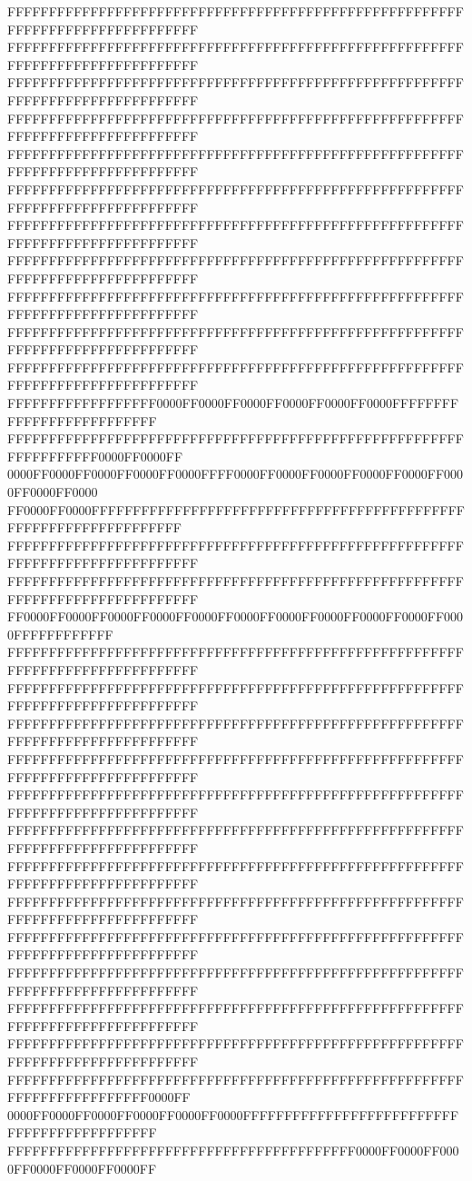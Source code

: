 FFFFFFFFFFFFFFFFFFFFFFFFFFFFFFFFFFFFFFFFFFFFFFFFFFFFFFFFFFFFFFFFFFFFFFFFFFFFFF
FFFFFFFFFFFFFFFFFFFFFFFFFFFFFFFFFFFFFFFFFFFFFFFFFFFFFFFFFFFFFFFFFFFFFFFFFFFFFF
FFFFFFFFFFFFFFFFFFFFFFFFFFFFFFFFFFFFFFFFFFFFFFFFFFFFFFFFFFFFFFFFFFFFFFFFFFFFFF
FFFFFFFFFFFFFFFFFFFFFFFFFFFFFFFFFFFFFFFFFFFFFFFFFFFFFFFFFFFFFFFFFFFFFFFFFFFFFF
FFFFFFFFFFFFFFFFFFFFFFFFFFFFFFFFFFFFFFFFFFFFFFFFFFFFFFFFFFFFFFFFFFFFFFFFFFFFFF
FFFFFFFFFFFFFFFFFFFFFFFFFFFFFFFFFFFFFFFFFFFFFFFFFFFFFFFFFFFFFFFFFFFFFFFFFFFFFF
FFFFFFFFFFFFFFFFFFFFFFFFFFFFFFFFFFFFFFFFFFFFFFFFFFFFFFFFFFFFFFFFFFFFFFFFFFFFFF
FFFFFFFFFFFFFFFFFFFFFFFFFFFFFFFFFFFFFFFFFFFFFFFFFFFFFFFFFFFFFFFFFFFFFFFFFFFFFF
FFFFFFFFFFFFFFFFFFFFFFFFFFFFFFFFFFFFFFFFFFFFFFFFFFFFFFFFFFFFFFFFFFFFFFFFFFFFFF
FFFFFFFFFFFFFFFFFFFFFFFFFFFFFFFFFFFFFFFFFFFFFFFFFFFFFFFFFFFFFFFFFFFFFFFFFFFFFF
FFFFFFFFFFFFFFFFFFFFFFFFFFFFFFFFFFFFFFFFFFFFFFFFFFFFFFFFFFFFFFFFFFFFFFFFFFFFFF
FFFFFFFFFFFFFFFFFF0000FF0000FF0000FF0000FF0000FF0000FFFFFFFFFFFFFFFFFFFFFFFFFF
FFFFFFFFFFFFFFFFFFFFFFFFFFFFFFFFFFFFFFFFFFFFFFFFFFFFFFFFFFFFFFFFFF0000FF0000FF
0000FF0000FF0000FF0000FF0000FFFF0000FF0000FF0000FF0000FF0000FF0000FF0000FF0000
FF0000FF0000FFFFFFFFFFFFFFFFFFFFFFFFFFFFFFFFFFFFFFFFFFFFFFFFFFFFFFFFFFFFFFFFFF
FFFFFFFFFFFFFFFFFFFFFFFFFFFFFFFFFFFFFFFFFFFFFFFFFFFFFFFFFFFFFFFFFFFFFFFFFFFFFF
FFFFFFFFFFFFFFFFFFFFFFFFFFFFFFFFFFFFFFFFFFFFFFFFFFFFFFFFFFFFFFFFFFFFFFFFFFFFFF
FF0000FF0000FF0000FF0000FF0000FF0000FF0000FF0000FF0000FF0000FF0000FFFFFFFFFFFF
FFFFFFFFFFFFFFFFFFFFFFFFFFFFFFFFFFFFFFFFFFFFFFFFFFFFFFFFFFFFFFFFFFFFFFFFFFFFFF
FFFFFFFFFFFFFFFFFFFFFFFFFFFFFFFFFFFFFFFFFFFFFFFFFFFFFFFFFFFFFFFFFFFFFFFFFFFFFF
FFFFFFFFFFFFFFFFFFFFFFFFFFFFFFFFFFFFFFFFFFFFFFFFFFFFFFFFFFFFFFFFFFFFFFFFFFFFFF
FFFFFFFFFFFFFFFFFFFFFFFFFFFFFFFFFFFFFFFFFFFFFFFFFFFFFFFFFFFFFFFFFFFFFFFFFFFFFF
FFFFFFFFFFFFFFFFFFFFFFFFFFFFFFFFFFFFFFFFFFFFFFFFFFFFFFFFFFFFFFFFFFFFFFFFFFFFFF
FFFFFFFFFFFFFFFFFFFFFFFFFFFFFFFFFFFFFFFFFFFFFFFFFFFFFFFFFFFFFFFFFFFFFFFFFFFFFF
FFFFFFFFFFFFFFFFFFFFFFFFFFFFFFFFFFFFFFFFFFFFFFFFFFFFFFFFFFFFFFFFFFFFFFFFFFFFFF
FFFFFFFFFFFFFFFFFFFFFFFFFFFFFFFFFFFFFFFFFFFFFFFFFFFFFFFFFFFFFFFFFFFFFFFFFFFFFF
FFFFFFFFFFFFFFFFFFFFFFFFFFFFFFFFFFFFFFFFFFFFFFFFFFFFFFFFFFFFFFFFFFFFFFFFFFFFFF
FFFFFFFFFFFFFFFFFFFFFFFFFFFFFFFFFFFFFFFFFFFFFFFFFFFFFFFFFFFFFFFFFFFFFFFFFFFFFF
FFFFFFFFFFFFFFFFFFFFFFFFFFFFFFFFFFFFFFFFFFFFFFFFFFFFFFFFFFFFFFFFFFFFFFFFFFFFFF
FFFFFFFFFFFFFFFFFFFFFFFFFFFFFFFFFFFFFFFFFFFFFFFFFFFFFFFFFFFFFFFFFFFFFFFFFFFFFF
FFFFFFFFFFFFFFFFFFFFFFFFFFFFFFFFFFFFFFFFFFFFFFFFFFFFFFFFFFFFFFFFFFFFFFFF0000FF
0000FF0000FF0000FF0000FF0000FF0000FFFFFFFFFFFFFFFFFFFFFFFFFFFFFFFFFFFFFFFFFFFF
FFFFFFFFFFFFFFFFFFFFFFFFFFFFFFFFFFFFFFFFFF0000FF0000FF0000FF0000FF0000FF0000FF
